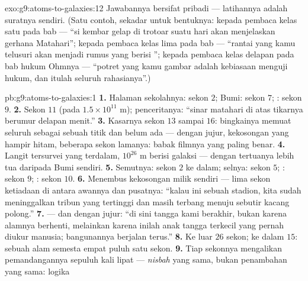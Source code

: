 \begin{solution}{exo:g9:atoms-to-galaxies:12}
Jawabannya bersifat pribadi --- latihannya adalah suratnya sendiri.
(Satu contoh, sekadar untuk bentuknya: kepada pembaca kelas satu pada
bab  --- ``si kembar gelap di trotoar suatu hari akan
menjelaskan gerhana Matahari''; kepada pembaca kelas lima pada bab
 --- ``rantai yang kamu telusuri akan menjadi rumus yang
berisi ''; kepada pembaca kelas delapan pada bab hukum Ohmnya ---
``potret yang kamu gambar adalah kebiasaan menguji hukum, dan itulah
seluruh rahasianya''.)
\end{solution}

\begin{solution}{pb:g9:atoms-to-galaxies:1}
\textbf{1.} Halaman sekolahnya: sekon $2$; Bumi: sekon $7$; 
: sekon $9$.
\textbf{2.} Sekon $11$ (pada $1.5 \times 10^{11}$ \unit{m});
penceritanya: ``sinar matahari di atas tikarnya berumur delapan
menit.''
\textbf{3.} Kasarnya sekon $13$ sampai $16$: bingkainya memuat
seluruh  sebagai sebuah titik dan belum ada  ---
dengan jujur, kekosongan yang hampir hitam, beberapa sekon lamanya:
babak filmnya yang paling benar.
\textbf{4.} Langit tersurvei yang terdalam, $10^{26}$ \unit{m} berisi
galaksi --- dengan  tertuanya lebih tua daripada Bumi sendiri.
\textbf{5.} Semutnya: sekon $2$ ke dalam; selnya: sekon $5$;
: sekon $9$; : sekon $10$.
\textbf{6.} Menembus kekosongan milik  sendiri --- lima sekon
ketiadaan di antara awannya dan pusatnya: ``kalau  ini sebuah
stadion, kita sudah meninggalkan tribun yang tertinggi dan masih
terbang menuju sebutir kacang polong.''
\textbf{7.}  --- dan dengan jujur: ``di sini tangga kami
berakhir, bukan karena alamnya berhenti, melainkan karena inilah anak
tangga terkecil yang pernah diukur manusia; bangunannya berjalan
terus.''
\textbf{8.} Ke luar $26$ sekon; ke dalam $15$: sebuah alam semesta
empat puluh satu sekon.
\textbf{9.} Tiap sekonnya mengalikan pemandangannya sepuluh kali lipat
--- \emph{nisbah} yang sama, bukan penambahan yang sama: logika

\end{solution}

